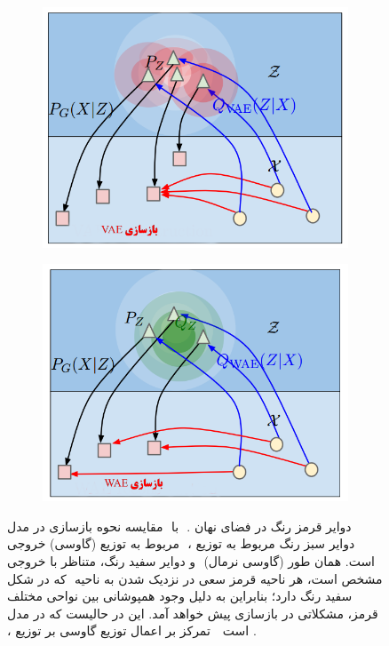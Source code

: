 \begin{figure}[H]
	\centering
	\begin{subfigure}[b]{0.4\textwidth}
		\includegraphics[width=\textwidth]{images/wae1.png}
		\caption{\vae}
		\label{fig:wae-vae}
	\end{subfigure}
	\begin{subfigure}[b]{0.4\textwidth}
		\includegraphics[width=\textwidth]{images/wae2.png}
		\caption{\wae}
		\label{fig:wae-wae}
	\end{subfigure}
	\caption{
		مقایسه نحوه بازسازی در مدل  ‎‎\wae{}‎ با ‎\vae{}‎ . دوایر قرمز رنگ در فضای نهان مربوط به توزیع (گاوسی) خروجی ‎\encoder{}‎ ، دوایر سبز رنگ مربوط به توزیع ‎‎\marginal{}‎ خروجی ‎\encoder{}‎ و  دوایر سفید رنگ، متناظر با ‎\priordist{}‎ (گاوسی نرمال) است. همان طور که در شکل ‎‎ مشخص است، هر ناحیه قرمز سعی در نزدیک شدن به ناحیه سفید رنگ دارد؛ بنابراین به دلیل وجود همپوشانی بین نواحی مختلف قرمز، مشکلاتی در بازسازی پیش خواهد آمد. این در حالیست که در مدل ‎\wae{}‎ ، تمرکز بر اعمال توزیع گاوسی بر توزیع ‎\marginal{}‎ \encoder{}‎‎ است \cite{wae}.
	}
	\label{fig:wae}
\end{figure}
